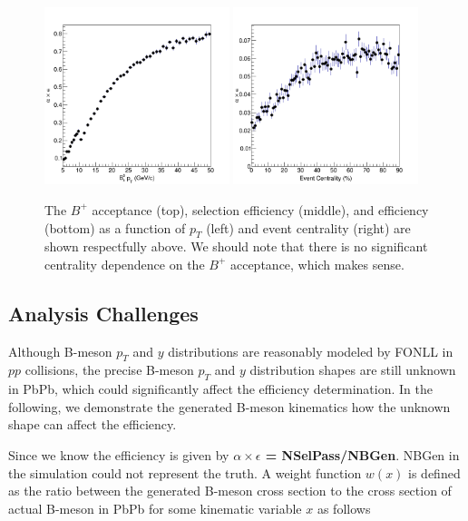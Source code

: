 \begin{figure}[h]
\begin{center}
\includegraphics[width=0.48\textwidth]{Figures/Chapter5/BPEff1DPtHis.png}
\includegraphics[width=0.48\textwidth]{Figures/Chapter5/BPEff1DCentHis.png}
\caption{The $B^+$ acceptance (top), selection efficiency (middle), and efficiency (bottom) as a function of $p_T$ (left) and event centrality (right) are shown respectfully above. We should note that there is no significant centrality dependence on the $B^+$ acceptance, which makes sense.}
\label{BPEffAll}
\end{center}
\end{figure}


\subsection{Analysis Challenges}

Although B-meson $p_T$ and $y$ distributions are reasonably modeled by FONLL in $pp$ collisions, the precise B-meson $p_T$ and $y$ distribution shapes are still unknown in PbPb, which could significantly affect the efficiency determination. In the following, we demonstrate the generated B-meson kinematics how the unknown shape can affect the efficiency. 

Since we know the efficiency is given by \textbf{$\alpha \times \epsilon$ = NSelPass/NBGen}. NBGen in the simulation could not represent the truth. A weight function $w(x)$ is defined as the ratio between the generated B-meson cross section to the cross section of actual B-meson in PbPb for some kinematic variable $x$ as follows

